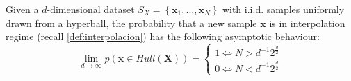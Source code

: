 \begin{theorem}\cite{barany1988shape}\label{dparadoxa}
	Given a $d$-dimensional dataset $S_X=\left\{\mathbf{x}_1,...,\mathbf{x}_N\right\}$ with i.i.d. samples uniformly drawn from a hyperball, the probability that a new sample $\mathbf{x}$ is in interpolation regime (recall \cref{def:interpolacion}) has the following asymptotic behaviour:\\
	
	\begin{equation}
		\lim_{d \to \infty}p(\mathbf{x}\in Hull(\mathbf{X}))=
		\begin{cases}
			1 \iff N>d^{-1}2^{\frac{d}{2}}\\
			0 \iff N<d^{-1}2^{\frac{d}{2}}
		\end{cases}	
	\end{equation}
\end{theorem}

